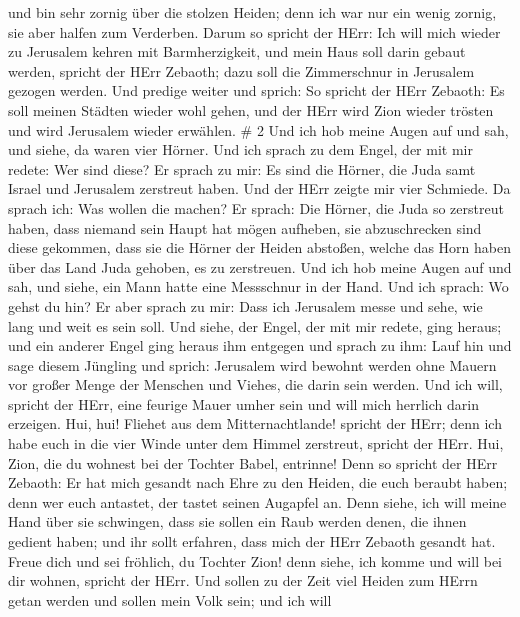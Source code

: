  und bin sehr zornig über die stolzen Heiden; denn ich war
nur ein wenig zornig, sie aber halfen zum Verderben.  Darum
so spricht der HErr: Ich will mich wieder zu Jerusalem kehren mit
Barmherzigkeit, und mein Haus soll darin gebaut werden, spricht der HErr
Zebaoth; dazu soll die Zimmerschnur in Jerusalem gezogen werden.
 Und predige weiter und sprich: So spricht der HErr
Zebaoth: Es soll meinen Städten wieder wohl gehen, und der HErr wird
Zion wieder trösten und wird Jerusalem wieder erwählen. \# 2
 Und ich hob meine Augen auf und sah, und siehe, da waren
vier Hörner.  Und ich sprach zu dem Engel, der mit mir
redete: Wer sind diese? Er sprach zu mir: Es sind die Hörner, die Juda
samt Israel und Jerusalem zerstreut haben.  Und der HErr
zeigte mir vier Schmiede.  Da sprach ich: Was wollen die
machen? Er sprach: Die Hörner, die Juda so zerstreut haben, dass niemand
sein Haupt hat mögen aufheben, sie abzuschrecken sind diese gekommen,
dass sie die Hörner der Heiden abstoßen, welche das Horn haben über das
Land Juda gehoben, es zu zerstreuen.  Und ich hob meine
Augen auf und sah, und siehe, ein Mann hatte eine Messschnur in der
Hand.  Und ich sprach: Wo gehst du hin? Er aber sprach zu
mir: Dass ich Jerusalem messe und sehe, wie lang und weit es sein soll.
 Und siehe, der Engel, der mit mir redete, ging heraus; und
ein anderer Engel ging heraus ihm entgegen  und sprach zu
ihm: Lauf hin und sage diesem Jüngling und sprich: Jerusalem wird
bewohnt werden ohne Mauern vor großer Menge der Menschen und Viehes, die
darin sein werden.  Und ich will, spricht der HErr, eine
feurige Mauer umher sein und will mich herrlich darin erzeigen.
 Hui, hui! Fliehet aus dem Mitternachtlande! spricht der
HErr; denn ich habe euch in die vier Winde unter dem Himmel zerstreut,
spricht der HErr.  Hui, Zion, die du wohnest bei der
Tochter Babel, entrinne!  Denn so spricht der HErr Zebaoth:
Er hat mich gesandt nach Ehre zu den Heiden, die euch beraubt haben;
denn wer euch antastet, der tastet seinen Augapfel an. 
Denn siehe, ich will meine Hand über sie schwingen, dass sie sollen ein
Raub werden denen, die ihnen gedient haben; und ihr sollt erfahren, dass
mich der HErr Zebaoth gesandt hat.  Freue dich und sei
fröhlich, du Tochter Zion! denn siehe, ich komme und will bei dir
wohnen, spricht der HErr.  Und sollen zu der Zeit viel
Heiden zum HErrn getan werden und sollen mein Volk sein; und ich will
